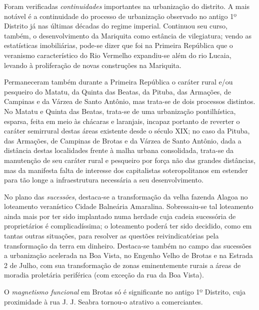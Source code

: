 Foram verificadas \textit{continuidades} importantes na urbanização do distrito. A mais notável é a continuidade do processo de urbanização observado no antigo 1º Distrito já nas últimas décadas do regime imperial. Continuou seu curso, também, o desenvolvimento da Mariquita como estância de vilegiatura; vendo as estatísticas imobiliárias, pode-se dizer que foi na Primeira República que o veranismo característico do Rio Vermelho expandiu-se além do rio Lucaia, levando à proliferação de novas construções na Mariquita. 

Permaneceram também durante a Primeira República o caráter rural e/ou pesqueiro do Matatu, da Quinta das Beatas, da Pituba, das Armações, de Campinas e da Várzea de Santo Antônio, mas trata-se de dois processos distintos. No Matatu e Quinta das Beatas, trata-se de uma urbanização pontilhística, esparsa, feita em meio às chácaras e laranjais, incapaz portanto de reverter o caráter semirrural destas áreas existente desde o século XIX; no caso da Pituba, das Armações, de Campinas de Brotas e da Várzea de Santo Antônio, dada a distância destas localidades frente à malha urbana consolidada, trata-se da manutenção de seu caráter rural e pesqueiro por força não das grandes distâncias, mas da manifesta falta de interesse dos capitalistas soteropolitanos em estender para tão longe a infraestrutura necessária a seu desenvolvimento.

No plano das \textit{sucessões}, destaca-se a transformação da velha fazenda Alagoa no loteamento veranístico Cidade Balneária Amaralina. Sobressaiu-se tal loteamento ainda mais por ter sido implantado numa herdade cuja cadeia sucessória de proprietários é complicadíssima; o loteamento poderá ter sido decidido, como em tantas outras situações, para resolver as questões reivindicatórias pela transformação da terra em dinheiro. Destaca-se também no campo das sucessões a urbanização acelerada na Boa Vista, no Engenho Velho de Brotas e na Estrada 2 de Julho, com sua transformação de zonas eminentemente rurais a áreas de moradia proletária periférica (com exceção da rua da Boa Vista). 

O \textit{magnetismo funcional} em Brotas só é significante no antigo 1º Distrito, cuja proximidade à rua J. J. Seabra tornou-o atrativo a comerciantes.

